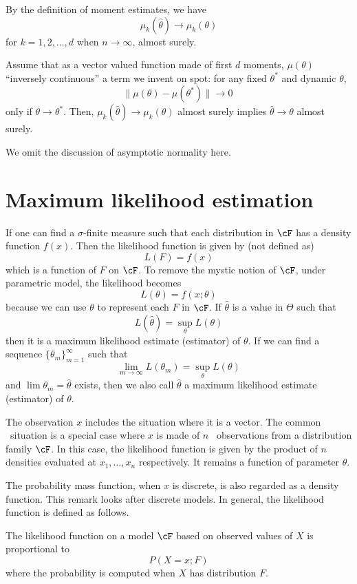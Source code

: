 By the definition of moment estimates, we have
\[
\mu_k(\hat \theta) \to \mu_k(\theta)
\]
for $k=1, 2, \ldots, d$ when $n \to \infty$, almost surely.

Assume that as a vector valued function made
of first $d$ moments, $\mu(\theta)$ ``inversely continuous''
a term we invent on spot: for any fixed $\theta^*$
and dynamic $\theta$,
\[
\| \mu(\theta) - \mu(\theta^*)\| \to 0\
\]
only if $\theta \to \theta^*$.
Then, $\mu_k(\hat \theta) \to \mu_k(\theta)$
almost surely implies $\hat \theta \to \theta$ almost
surely. 

We omit the discussion of asymptotic normality here.

\section{Maximum likelihood estimation}
If one can find a $\sigma$-finite measure such that each distribution in
$\cF$ has a density function $f(x)$. Then the likelihood function is
given by (not defined as)
\[
L( F) = f(x)
\]
which is a function of $F$ on $\cF$. To remove the mystic notion of
$\cF$, under parametric model, the likelihood becomes
\[
L(\theta) = f(x; \theta)
\]
because we can use $\theta$ to represent each $F$ in $\cF$.
If $\hat \theta$ is a value in $\Theta$ such that
\[
L(\hat \theta) = \sup_{\theta} L(\theta)
\]
then it is a maximum likelihood estimate (estimator) of $\theta$.
If we can find a sequence $\{\theta_m\}_{m=1}^\infty$ such that
\[
\lim_{m \to \infty} L(\theta_m) = \sup_{\theta} L(\theta)
\]
and $\lim \theta_m = \hat \theta$ exists, then
we also call $\hat \theta$ a maximum likelihood estimate (estimator) of $\theta$.

The observation $x$ includes the situation where it is a vector.
The common \iid\ situation is a special case where $x$ is made of
$n$ \iid\ observations from a distribution family $\cF$.
In this case, the likelihood function is given by the product of $n$ densities
evaluated at $x_1, \ldots, x_n$ respectively. It remains a function
of parameter $\theta$.

The probability mass function, when $x$ is discrete, is also regarded as a density
function. This remark looks after discrete models.
In general, the likelihood function is defined as follows.

\begin{defi}
The likelihood function on a model $\cF$ based on observed
values of $X$ is proportional to 
\[
P(X = x; F)
\]
where the probability is computed when $X$ has distribution $F$.
\end{defi}

